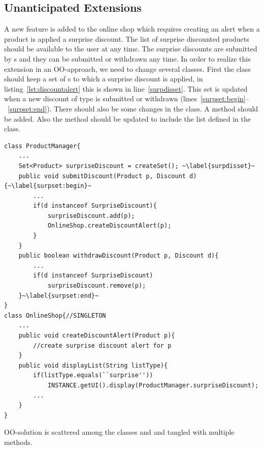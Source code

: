 \subsection{Unanticipated Extensions}
A new feature is added to the online shop which requires creating an alert when a product is applied a surprise discount. The list of surprise discounted products should be available to the user at any time. The surprise discounts are submitted by s and they can be submitted or withdrawn any time.  In order to realize this extension in an OO-approach, we need to change several classes. First the class  should keep a set of s to which a surprise discount is applied, in listing~\ref{lst:discountalert} this is shown in line~\ref{surpdisset}. This set is updated when a new discount of type  is submitted or withdrawn (lines~\ref{surpset:begin}--~\ref{surpset:end}). There should also be some changes in the  class. A  method should be added. Also the  method should be updated to include the  list defined in the  class.


\begin{lstlisting}[float, caption={A Java implementation of discount alert concern}, label={lst:discountalert}]
class ProductManager{
	...
	Set<Product> surpriseDiscount = createSet(); ~\label{surpdisset}~
	public void submitDiscount(Product p, Discount d){~\label{surpset:begin}~
		...
		if(d instanceof SurpriseDiscount){
			surpriseDiscount.add(p);
			OnlineShop.createDiscountAlert(p);
		}
	}
	public boolean withdrawDiscount(Product p, Discount d){
		...
		if(d instanceof SurpriseDiscount)
			surpriseDiscount.remove(p);
	}~\label{surpset:end}~
}
class OnlineShop{//SINGLETON
	...
	public void createDiscountAlert(Product p){
		//create surprise discount alert for p
	}
	public void displayList(String listType){
		if(listType.equals(``surprise''))
			INSTANCE.getUI().display(ProductManager.surpriseDiscount);
		...
	}
}
\end{lstlisting}


 OO-solution is scattered among the classes  and  and tangled with multiple methods.

